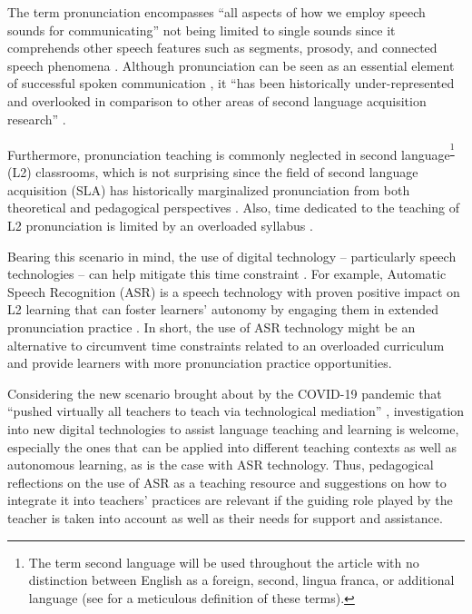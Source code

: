\documentclass[english]{textolivre}
\begin{document}
The term pronunciation encompasses ``all aspects of how we employ speech
sounds for communicating'' \cite[p.~247]{burns2020} not being
limited to single sounds since it comprehends other speech features such
as segments, prosody, and connected speech phenomena \cite{cardoso2017}.
Although pronunciation can be seen as an essential element of successful
spoken communication \cite{baldissera2021,pennington2019}, it ``has
been historically under-represented and overlooked in comparison to
other areas of second language acquisition research'' \cite[p.~75]{foote2017}.


Furthermore, pronunciation teaching is commonly neglected in second
language\textsuperscript{\footnote{The term second language will be used
  throughout the article with no distinction between English as a
  foreign, second, lingua franca, or additional language (see \textcite{jordao2014} for a meticulous definition of these terms).}} (L2) classrooms,
which is not surprising since the field of second language acquisition
(SLA) has historically marginalized pronunciation from both theoretical
and pedagogical perspectives \cite{olson2023}. Also, time dedicated to
the teaching of L2 pronunciation is limited by an overloaded syllabus
\cite{collins2016}.


Bearing this scenario in mind, the use of digital technology --
particularly speech technologies -- can help mitigate this time
constraint \cite{gottardi2022,silveira2022}. For example, Automatic
Speech Recognition (ASR) is a speech technology with proven positive
impact on L2 learning that can foster learners' autonomy by engaging
them in extended pronunciation practice \cite{gottardi2022}. In short, the
use of ASR technology might be an alternative to circumvent time
constraints related to an overloaded curriculum and provide learners
with more pronunciation practice opportunities.

Considering the new scenario brought about by the COVID-19 pandemic that
``pushed virtually all teachers to teach via technological mediation''
\cite[p.~529]{kern2024}, investigation into new digital technologies to
assist language teaching and learning is welcome, especially the ones
that can be applied into different teaching contexts as well as
autonomous learning, as is the case with ASR technology. Thus,
pedagogical reflections on the use of ASR as a teaching resource and
suggestions on how to integrate it into teachers' practices are relevant
if the guiding role played by the teacher is taken into account as well
as their needs for support and assistance.
\end{document}
